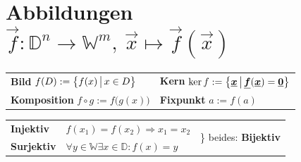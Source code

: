 \documentclass[german]{latex4ei/latex4ei_sheet}
\begin{document}
\section[Abbildungen]{Abbildungen $\vec f:\mathbb D^n \rightarrow \mathbb W^m,\ \vec x \mapsto \vec f(\vec x)$ }

\begin{sectionbox}
	
	\begin{tabular*}{\columnwidth}{@{\extracolsep\fill}ll@{}}
	\textbf{Bild} $f(D) := \bigl\{ \bigl. f(x) \, \bigr| \, x\in D \bigr\}$ & \textbf{Kern} $\ker f := \bigl\{ \bigl. \boldsymbol{\underline{x}} \, \bigr| \, \boldsymbol{\underline{f}}(\boldsymbol{\underline{x}}) = \boldsymbol{\underline{0}} \bigr\}$   \\
	\textbf{Komposition} $f \circ g := f\bigl( g(x) \bigr)$ & \textbf{Fixpunkt} $a := f(a)$ \\
	\end{tabular*} 
	
	\begin{tabular}{@{}lll}
			\textbf{Injektiv} & $f(x_1)=f(x_2) \Rightarrow x_1=x_2$ & \multirow{2}{2.0cm}{\Big \} beides: \textbf{Bijektiv} }\\
			\textbf{Surjektiv} & $\forall y\in \mathbb W \exists x\in \mathbb D:f(x)=y$ & \\ 
	\end{tabular}\\ 
\end{sectionbox}
\end{document}
